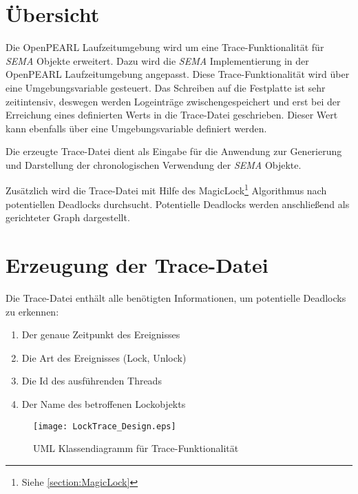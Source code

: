 \section{Übersicht}
\label{section:Übersicht}
Die OpenPEARL Laufzeitumgebung wird um eine Trace-Funktionalität für
\textit{SEMA} Objekte erweitert. Dazu wird die \textit{SEMA} Implementierung in
der OpenPEARL Laufzeitumgebung angepasst. Diese Trace-Funktionalität wird über
eine Umgebungsvariable gesteuert. Das Schreiben auf die Festplatte ist sehr
zeitintensiv, deswegen werden Logeinträge zwischengespeichert und erst bei der
Erreichung eines definierten Werts in die Trace-Datei geschrieben. Dieser Wert
kann ebenfalls über eine Umgebungsvariable definiert werden. 

Die erzeugte Trace-Datei dient als Eingabe für die Anwendung zur Generierung und
Darstellung der chronologischen Verwendung der \textit{SEMA} Objekte.

Zusätzlich wird die Trace-Datei mit Hilfe des MagicLock\footnote{Siehe
\cref{section:MagicLock}} Algorithmus nach potentiellen Deadlocks durchsucht.
Potentielle Deadlocks werden anschließend als gerichteter Graph dargestellt.


\section{Erzeugung der Trace-Datei}
\label{section:Erzeugung der Trace-Datei}
Die Trace-Datei enthält alle benötigten Informationen, um potentielle Deadlocks
zu erkennen:

\begin{enumerate}
  \item Der genaue Zeitpunkt des Ereignisses 
  \item Die Art des Ereignisses (Lock, Unlock)
  \item Die Id des ausführenden Threads
  \item Der Name des betroffenen Lockobjekts
\end{enumerate}

\begin{figure}[ht]
  \texttt{[image: LockTrace\_Design.eps]}
  \caption{UML Klassendiagramm für Trace-Funktionalität}
  \label{fig:LockTrace_Design}
\end{figure}

